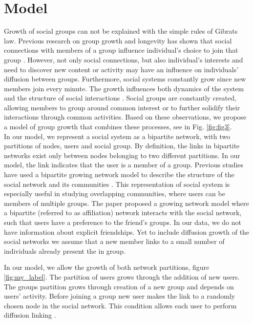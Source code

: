 \section{Model \label{sec:model}}
Growth of social groups can not be explained with the simple rules of Gibrats law. Previous research on group growth and longevity has shown that social connections with members of a group influence individual's choice to join that group \cite{kairam2012life, zheleva2009co}. However, not only social connections, but also individual's interests and need to discover new content or activity may have an influence on individuals' diffusion between groups. Furthermore, social systems constantly grow since new members join every minute. The growth influences both dynamics of the system \cite{mitrovic2011quantitative, dankulov2015dynamics} and the structure of social interactions \cite{vranic2021growth}. Social groups are constantly created, allowing members to group around common interest or to further solidify their interactions through common activities. Based on these observations, we propose a model of group growth that combines these processes, see in Fig. \ref{fig:fig3}.\\

In our model, we represent a social system as a bipartite network, with two partitions of nodes, users and social group. By definition, the links in bipartite networks exist only between nodes belonging to two different partitions. In our model, the link indicates that the user is a member of a group. Previous studies have used a bipartite growing network model to describe the structure of the social network and its communities \cite{zheleva2009co, leskovec2008microscopic, yang2014structure, ZHANG20136100}. This representation of social system is especially useful in studying overlapping communities, where users can be members of multiple groups. The paper \cite{zheleva2009co} proposed a growing network model where a bipartite (referred to as affiliation) network interacts with the social network, such that users have a preference to the friend’s groups. In our data, we do not have information about explicit friendships. Yet to include diffusion growth of the social networks we assume that a new member links to a small number of individuals already present the in group.

In our model, we allow the growth of both network partitions, figure \ref{fig:my_label}. The partition of users grows through the addition of new users. The groups partition grows through creation of a new group and depends on users' activity. Before joining a group new user makes the link to a randomly chosen node in the social network. This condition allows each user to perform diffusion linking \cite{kairam2012life}. 


